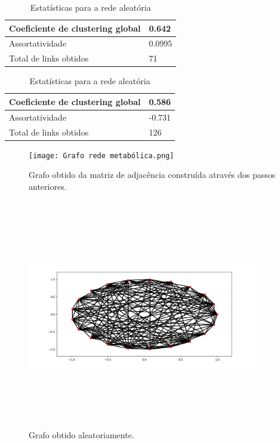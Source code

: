 \documentclass[brazilian,12pt,a4paper,final]{article}
\begin{document}
	\begin{table}[]
		\begin{tabular}{|l|l|}
			\hline
			Coeficiente de clustering global & 0.642  \\ \hline
			Assortatividade                  & 0.0995 \\ \hline
			Total de links obtidos           & 71     \\ \hline
		\end{tabular}
		\caption{Estatísticas para a rede metabólica}
		
		\vspace{0.5cm}

		\begin{tabular}{|l|l|}
			\hline
			Coeficiente de clustering global & 0.586  \\ \hline
			Assortatividade                  & -0.731 \\ \hline
			Total de links obtidos           & 126     \\ \hline
		\end{tabular}
		\caption{Estatísticas para a rede aleatória}
	\end{table}
	
	
	\begin{figure}[hbtp]
		\begin{center}
			\texttt{[image: Grafo rede metabólica.png]}
			\caption{Grafo obtido da matriz de adjacência construída através dos passos anteriores.}
			\label{fig}
		\end{center}
	\end{figure}
	
	\begin{figure}[hbtp]
		\begin{center}
			\includegraphics[width=10cm, height=10cm]{Grafo aleatório.png}
			\caption{Grafo obtido aleatoriamente.}
			\label{fig}
		\end{center}
	\end{figure}
	
\end{document}
